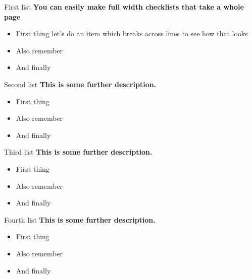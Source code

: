 \documentclass[9pt,bestpractices]{livecoms}
\begin{document}
\begin{Checklists*}[p!]

\begin{checklist}{First list}
\textbf{You can easily make full width checklists that take a whole page}
\begin{itemize}
\item First thing let's do an item which breaks across lines to see how that looks
\item Also remember
\item And finally
\end{itemize}
\end{checklist}

\begin{checklist}{Second list}
\textbf{This is some further description.}
\begin{itemize}
\item First thing
\item Also remember
\item And finally
\end{itemize}
\end{checklist}

\begin{checklist}{Third list}
\textbf{This is some further description.}
\begin{itemize}
\item First thing
\item Also remember
\item And finally
\end{itemize}
\end{checklist}

\begin{checklist}{Fourth list}
\textbf{This is some further description.}
\begin{itemize}
\item First thing
\item Also remember
\item And finally
\end{itemize}
\end{checklist}

\end{Checklists*}
\end{document}
